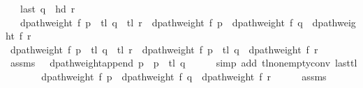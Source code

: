 \begin{isabellebody}
\ \ \ {\isachardoublequoteopen}last\ q\ {\isacharequal}{\kern0pt}\ hd\ r{\isachardoublequoteclose}\isanewline
\ \ \ {\isachardoublequoteopen}dpath{\isacharunderscore}{\kern0pt}weight\ f\ {\isacharparenleft}{\kern0pt}p\ {\isacharat}{\kern0pt}\ tl\ q\ {\isacharat}{\kern0pt}\ tl\ r{\isacharparenright}{\kern0pt}\ {\isacharequal}{\kern0pt}\ dpath{\isacharunderscore}{\kern0pt}weight\ f\ p\ {\isacharplus}{\kern0pt}\ dpath{\isacharunderscore}{\kern0pt}weight\ f\ q\ {\isacharplus}{\kern0pt}\ dpath{\isacharunderscore}{\kern0pt}weight\ f\ r{\isachardoublequoteclose}\isanewline
%
\isadelimproof
%
\endisadelimproof
%
\isatagproof
{}\isamarkupfalse%
\ {\isacharminus}{\kern0pt}\isanewline
\ \ \isamarkupfalse%
\ {\isachardoublequoteopen}dpath{\isacharunderscore}{\kern0pt}weight\ f\ {\isacharparenleft}{\kern0pt}p\ {\isacharat}{\kern0pt}\ tl\ q\ {\isacharat}{\kern0pt}\ tl\ r{\isacharparenright}{\kern0pt}\ {\isacharequal}{\kern0pt}\ dpath{\isacharunderscore}{\kern0pt}weight\ f\ {\isacharparenleft}{\kern0pt}p\ {\isacharat}{\kern0pt}\ tl\ q{\isacharparenright}{\kern0pt}\ {\isacharplus}{\kern0pt}\ dpath{\isacharunderscore}{\kern0pt}weight\ f\ r{\isachardoublequoteclose}\isanewline
\ \ \ \ \isamarkupfalse%
\ assms{\isacharparenleft}{\kern0pt}{}{\isacharcomma}{\kern0pt}\ {}{\isacharcomma}{\kern0pt}\ {}{\isacharparenright}{\kern0pt}\ dpath{\isacharunderscore}{\kern0pt}weight{\isacharunderscore}{\kern0pt}append{\isacharbrackleft}{\kern0pt}\ {\isacharquery}{\kern0pt}p\ {\isacharequal}{\kern0pt}\ {\isachardoublequoteopen}p\ {\isacharat}{\kern0pt}\ tl\ q{\isachardoublequoteclose}{\isacharbrackright}{\kern0pt}\isanewline
\ \ \ \ \isamarkupfalse%
\ {\isacharparenleft}{\kern0pt}simp\ add{\isacharcolon}{\kern0pt}\ tl{\isacharunderscore}{\kern0pt}non{\isacharunderscore}{\kern0pt}empty{\isacharunderscore}{\kern0pt}conv\ last{\isacharunderscore}{\kern0pt}tl{\isacharparenright}{\kern0pt}\isanewline
\ \ \isamarkupfalse%
\ \isamarkupfalse%
\ {\isachardoublequoteopen}{\isachardot}{\kern0pt}{\isachardot}{\kern0pt}{\isachardot}{\kern0pt}\ {\isacharequal}{\kern0pt}\ dpath{\isacharunderscore}{\kern0pt}weight\ f\ p\ {\isacharplus}{\kern0pt}\ dpath{\isacharunderscore}{\kern0pt}weight\ f\ q\ {\isacharplus}{\kern0pt}\ dpath{\isacharunderscore}{\kern0pt}weight\ f\ r{\isachardoublequoteclose}\isanewline
\ \ \ \ \isamarkupfalse%
\ assms{\isacharparenleft}{\kern0pt}{}{\isacharcomma}{\kern0pt}\ {}{\isacharcomma}{\kern0pt}\ {}{\isacharparenright}{\kern0pt}\isanewline

\end{isabellebody}
